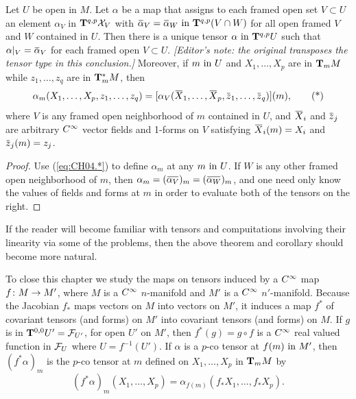\documentclass[../main]{subfiles}
\begin{document}
\begin{corollary} \label{cor:ch4.2}
Let $U$ be open in $M$. Let $\alpha$ be a map that assigns to each framed open set $V\subset U$ an element $\alpha_V$ in $\tensorbundle{\vectorFields_V}{q}{p}$ with $\xoverline\alpha_V = \xoverline\alpha_W \InText \tensorbundle{(V\cap W)}{q}{p}$ for all open framed $V$ and $W$ contained in $U$. Then there is a unique tensor $\alpha \InText \tensorbundle{U}{q}{p}$ such that $\alpha|_V = \xoverline\alpha_V$ for each framed open $V\subset U$. \emph{[Editor's note: the original transposes the tensor type in this conclusion.]} Moreover, if $m\InText U$ and $X_1,\dots,X_p$ are in $\tangentspace{M}{m}$ while $z_1,\dots,z_q$ are in $\cotangentspace{M}{m}$, then
\[
\alpha_m(X_1,\dots,X_p, z_1,\dots,z_q) = [\alpha_V(\xoverline X_1,\dots,\xoverline X_p, \xoverline z_1,\dots,\xoverline z_q)](m), \tag{*} \label{eq:CH04.*}
\]
where $V$ is any framed open neighborhood of $m$ contained in $U$, and $\xoverline X_i$ and $\xoverline z_j$ are arbitrary $\CInfty$ vector fields and 1-forms on $V$ satisfying $\xoverline X_i(m)=X_i$ and $\xoverline z_j(m)=z_j$.
\end{corollary}

\begin{proof}
Use (\ref{eq:CH04.*}) to define $\alpha_m$ at any $m\InText U$. If $W$ is any other framed open neighborhood of $m$, then $\alpha_m = (\xoverline{\alpha_V})_m = (\xoverline{\alpha_W})_m$, and one need only know the values of fields and forms at $m$ in order to evaluate both of the tensors on the right.
\end{proof}



If the reader will become familiar with tensors and compuitations involving their linearity via some of the problems, then the above theorem and corollary should become more natural.

To close this chapter we study the maps on tensors induced by a $\CInfty$ map $f \colon M \functionMaps M'$, where $M$ is a $\CInfty$ $n$-manifold and $M'$ is a $\CInfty$ $n'$-manifold. Because the Jacobian $f_*$ maps vectors on $M$ into vectors on $M'$, it induces a map $f^\ast$ of covariant tensors (and forms) on $M'$ into covariant tensors (and forms) on $M$. If $g$ is in $\tensorbundle{U'}{0}{0} = \realFunctions_{U'}$, for open $U'$ on $M'$, then $f^\ast(g) = g\circ f$ is a $\CInfty$ real valued function in $\realFunctions_U$ where $U = f^{-1}(U')$. If $\alpha$ is a $p$-co tensor at $f(m) \InText M'$, then $(f^*\alpha)_m$ is the $p$-co tensor at $m$ defined on $X_1,\dots,X_p$ in $\tangentspace{M}{m}$ by
\[ (f^\ast\alpha)_m(X_1,\dots,X_p)  = \alpha_{f(m)}(f_*X_1,\dots,f_*X_p). \]
\end{document}
